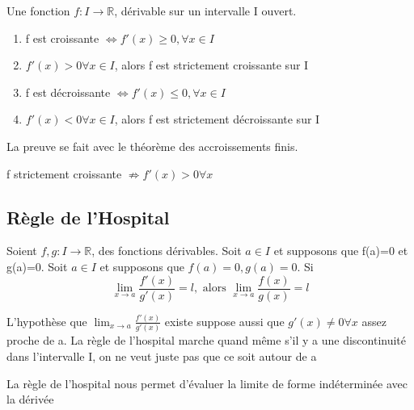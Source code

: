 \documentclass{article}
\begin{document}
\begin{theorem}
    Une fonction $f:I \to \mathbb{R}$, dérivable sur un intervalle I
    ouvert.
    \begin{enumerate}
	\item f est croissante $\Longleftrightarrow f'(x) \geq 0,
	    \forall x \in I$
	\item $f'(x) >0 \forall x \in I$, alors f est strictement
	    croissante sur I
	\item f est décroissante $\Longleftrightarrow f'(x) \leq 0,
	    \forall x \in I$
	\item $f'(x) <0 \forall x \in I$, alors f est strictement
	    décroissante sur I
    \end{enumerate}
\end{theorem}

\begin{intuition}
    La preuve se fait avec le théorème des accroissements finis.
\end{intuition}

\begin{remark}
    f strictement croissante $\not\Longrightarrow f'(x)>0 \forall x$
\end{remark}

\subsection{Règle de l'Hospital}

\begin{theorem}
    Soient $f,g:I \to \mathbb{R}$, des fonctions dérivables. Soit
    $a \in I$ et supposons que f(a)=0 et g(a)=0. Soit $a \in I$ et
    supposons que $f(a)=0, g(a)=0$. Si
    $$ \lim_{x \to a} \frac{f'(x)}{g'(x)}=l, \text{ alors }
    \lim_{x \to a} \frac{f(x)}{g(x)} = l$$
\end{theorem}

\begin{remark}
    L'hypothèse que $ \lim_{x \to a} \frac{f'(x)}{g'(x)}$ existe suppose
    aussi que $g'(x) \neq 0 \forall x$ assez proche de a. La règle de
    l'hospital marche quand même s'il y a une discontinuité dans
    l'intervalle I, on ne veut juste pas que ce soit autour de a
\end{remark}

\begin{intuition}
    La règle de l'hospital nous permet d'évaluer la limite de forme
    indéterminée avec la dérivée
\end{intuition}
\end{document}
